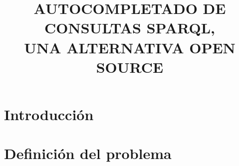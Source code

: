 \documentclass[conference,compsoc]{IEEEtran}
\begin{document}
\title{AUTOCOMPLETADO DE CONSULTAS SPARQL,\\UNA ALTERNATIVA OPEN SOURCE}

\author{
}

\maketitle

\IEEEpubidadjcol

\begin{abstract}
    
\end{abstract}

\begin{IEEEkeywords}
\end{IEEEkeywords}

\IEEEpeerreviewmaketitle

\section{Introducción}

\section{Definición del problema}
\end{document}
